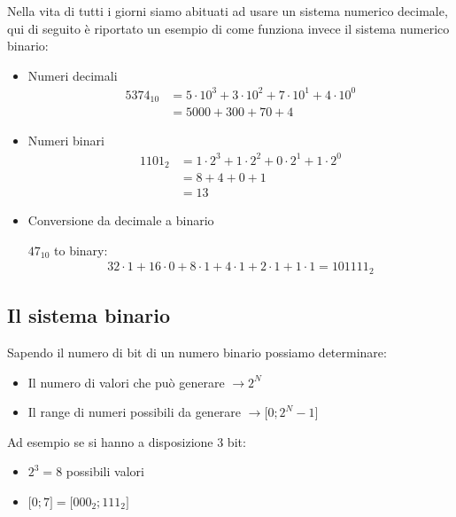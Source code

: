 \documentclass[../main.tex]{subfiles}
\begin{document}
Nella vita di tutti i giorni siamo abituati ad usare un sistema numerico decimale, qui di seguito è riportato un esempio di come funziona invece il sistema numerico binario:
\begin{itemize}
    \item Numeri decimali \begin{align*}
        5374_{10}&=5\cdot 10^3+3  \cdot 10^2+7\cdot 10^1+4\cdot 10^0 \\
        &=5000+300+70+4
    \end{align*}
    \item Numeri binari \begin{align*}
        1101_2&=1 \cdot 2^3+1 \cdot 2^2+0 \cdot2^1+1\cdot2^0 \\
        &=8+4+0+1 \\
        &=13
    \end{align*}
    \item Conversione da decimale a binario \\
    \begin{center}
        $47_{10}$ to binary:
        \begin{align*}
            32\cdot1+16\cdot0+8\cdot1+4\cdot1+2\cdot1+1\cdot1=101111_2
        \end{align*}    
    \end{center}
\end{itemize}

\subsection{Il sistema binario}
Sapendo il numero di bit di un numero binario possiamo determinare:
\begin{itemize}
    \item Il numero di valori che può generare $\rightarrow 2^N$
    \item Il range di numeri possibili da generare $\rightarrow \lbrack0;2^N-1\rbrack$
\end{itemize}
Ad esempio se si hanno a disposizione 3 bit:
\begin{itemize}
    \item $2^3=8$ possibili valori
    \item $\lbrack0;7\rbrack=\lbrack000_2;111_2\rbrack$
\end{itemize}
\end{document}
